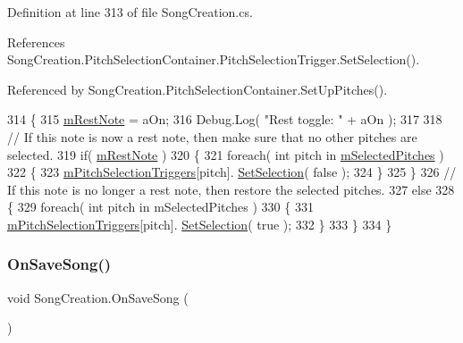 Definition at line 313 of file Song\+Creation.\+cs.



References Song\+Creation.\+Pitch\+Selection\+Container.\+Pitch\+Selection\+Trigger.\+Set\+Selection().



Referenced by Song\+Creation.\+Pitch\+Selection\+Container.\+Set\+Up\+Pitches().


\begin{DoxyCode}
314         \{
315             \hyperlink{group___s_c_handlers_gace289a908db9ba443c50ec8656ae05b1}{mRestNote} = aOn;
316             Debug.Log( \textcolor{stringliteral}{"Rest toggle: "} + aOn );
317 
318             \textcolor{comment}{// If this note is now a rest note, then make sure that no other pitches are selected.}
319             \textcolor{keywordflow}{if}( \hyperlink{group___s_c_handlers_gace289a908db9ba443c50ec8656ae05b1}{mRestNote} )
320             \{
321                 \textcolor{keywordflow}{foreach}( \textcolor{keywordtype}{int} pitch \textcolor{keywordflow}{in} \hyperlink{group___s_c_handlers_ga816236cbae1f13ea34be94fb1b86b7cd}{mSelectedPitches} )
322                 \{
323                     \hyperlink{group___s_c_handlers_ga1affedf973b4aa39505b35053c12df7e}{mPitchSelectionTriggers}[pitch].
      \hyperlink{group___s_c_handlers_ga0eebfa085bd5326ed4cb4981cf02d2e0}{SetSelection}( \textcolor{keyword}{false} );
324                 \}
325             \}
326             \textcolor{comment}{// If this note is no longer a rest note, then restore the selected pitches.}
327             \textcolor{keywordflow}{else}
328             \{
329                 \textcolor{keywordflow}{foreach}( \textcolor{keywordtype}{int} pitch \textcolor{keywordflow}{in} mSelectedPitches )
330                 \{
331                     \hyperlink{group___s_c_handlers_ga1affedf973b4aa39505b35053c12df7e}{mPitchSelectionTriggers}[pitch].
      \hyperlink{group___s_c_handlers_ga0eebfa085bd5326ed4cb4981cf02d2e0}{SetSelection}( \textcolor{keyword}{true} );
332                 \}
333             \}
334         \}
\end{DoxyCode}
\mbox{\label{group___s_c_handlers_ga3fac289dfb9e67d94afbeb0dfdb22f48}} 
\subsubsection{\texorpdfstring{On\+Save\+Song()}{OnSaveSong()}}
{\footnotesize\ttfamily void Song\+Creation.\+On\+Save\+Song (\begin{DoxyParamCaption}{ }\end{DoxyParamCaption})}



